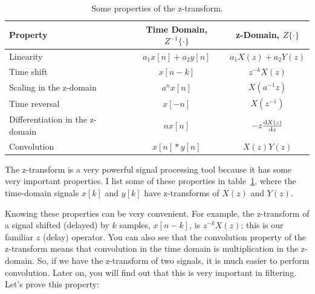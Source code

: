 \begin{table}
\caption{Some properties of the z-transform.\label{tb:zt-property}}
\begin{center}
\begin{tabular}{|l|c|c|} \hline
Property      & Time Domain, $Z^{-1}\{\cdot\}$ & z-Domain, $Z\{\cdot\}$ \\ \hline\hline
Linearity     & $a_1x[n]+a_2y[n]$ & $a_1X(z)+a_2Y(z)$\\ 
Time shift    & $x[n-k]$       & $z^{-k}X(z)$\\ 
Scaling in the z-domain 
              & $a^nx[n]$        & $X(a^{-1}z)$ \\ 
Time reversal & $x[-n]$        & $X(z^{-1})$\\ 
Differentiation in the z-domain 
              & $nx[n]$          & $-z \frac{\mathrm{d} X(z)}{\mathrm{d} z}$ \\ 
Convolution   & $x[n] \ast y[n]$       & $X(z)Y(z)$ \\ \hline
\end{tabular}
\end{center}
\end{table}

The z-transform is a very powerful signal processing tool because it
has some very important properties. I list some of these properties in
table~\ref{tb:zt-property}, where the time-domain signals $x[k]$
and $y[k]$ have z-transforms of $X(z)$ and $Y(z)$.

Knowing these properties can be very convenient. For example, the
z-transform of a signal shifted (delayed) by $k$ samples, $x[n-k]$,
is $z^{-k}X(z)$; this is our familiar $z$ (delay) operator. You can
also see that the convolution property of the z-transform means that
convolution in the time domain is multiplication in the z-domain. So,
if we have the z-transform of two signals, it is much easier to
perform convolution.  Later on, you will find out that this is very
important in filtering. Let's prove this property:

